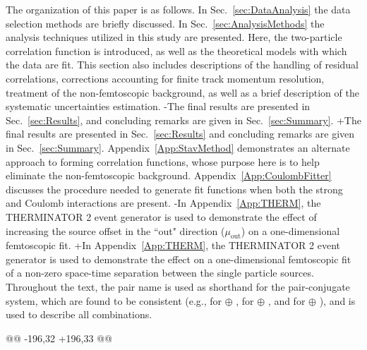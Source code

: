{ The organization of this paper is as follows.  
 In Sec.~\ref{sec:DataAnalysis} the data selection methods are briefly discussed.
 In Sec.~\ref{sec:AnalysisMethods} the analysis techniques utilized in this study are presented.  
 Here, the two-particle correlation function is introduced, as well as the theoretical models with which the data are fit.  
 This section also includes descriptions of the handling of residual correlations, corrections accounting for finite track momentum resolution, treatment of the non-femtoscopic background, as well as a brief description of the systematic uncertainties estimation.  
-The final results are presented in Sec.~\ref{sec:Results}, and concluding remarks are given in Sec.~\ref{sec:Summary}.
+The final results are presented in Sec.~\ref{sec:Results} and concluding remarks are given in Sec.~\ref{sec:Summary}.
 Appendix~\ref{App:StavMethod} demonstrates an alternate approach to forming correlation functions, whose purpose here is to help eliminate the non-femtoscopic background.
 Appendix~\ref{App:CoulombFitter} discusses the procedure needed to generate fit functions when both the strong and Coulomb interactions are present.
-In Appendix~\ref{App:THERM}, the THERMINATOR 2 event generator is used to demonstrate the effect of increasing the source offset in the ``out" direction ($\mu_{\mathrm{out}}$) on a one-dimensional femtoscopic fit.
+In Appendix~\ref{App:THERM}, the THERMINATOR 2 event generator is used to demonstrate the effect on a one-dimensional femtoscopic fit of a non-zero space-time separation between the single particle sources.
 Throughout the text, the pair name is used as shorthand for the pair-conjugate system, which are found to be consistent (e.g., \LamKchP for \LamKchP $\oplus$ \ALamKchM, \LamKchM for \LamKchM $\oplus$ \ALamKchP, and \LamKs for \LamKs $\oplus$ \ALamKs), and \LamK is used to describe all \LamK combinations.
 
@@ -196,32 +196,33 @@
 \label{sec:DataAnalysis}
 
}
